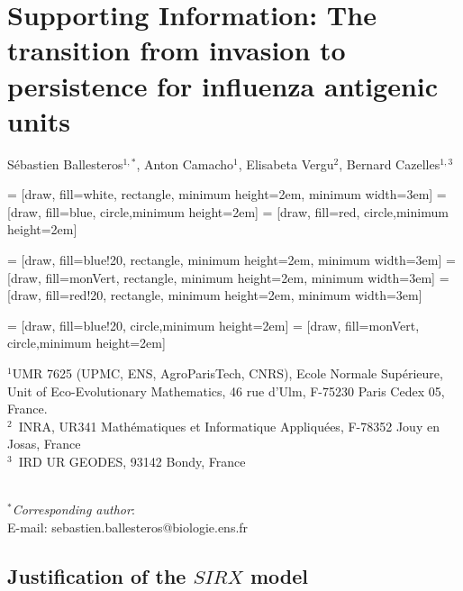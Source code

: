\chapter{Supporting Information: The transition from invasion to
  persistence for influenza antigenic units}





Sébastien Ballesteros$^{1,*}$,
Anton Camacho$^{1}$,
Elisabeta Vergu$^{2}$,
Bernard Cazelles$^{1,3}$

 = [draw, fill=white, rectangle, minimum height=2em, minimum width=3em]
 = [draw, fill=blue, circle,minimum height=2em]
 = [draw, fill=red, circle,minimum height=2em]

 = [draw, fill=blue!20, rectangle, minimum height=2em, minimum width=3em]
 = [draw, fill=monVert, rectangle, minimum height=2em, minimum width=3em]
 = [draw, fill=red!20, rectangle, minimum height=2em, minimum width=3em]

 = [draw, fill=blue!20, circle,minimum height=2em]
 = [draw, fill=monVert, circle,minimum height=2em]



\vspace{2cm}

$^1$UMR 7625  (UPMC, ENS, AgroParisTech, CNRS), Ecole Normale Supérieure, Unit of Eco-Evolutionary Mathematics,  46 rue d'Ulm, F-75230 Paris Cedex 05, France. \\
$^2$~INRA, UR341 Mathématiques et Informatique Appliquées, F-78352 Jouy en Josas, France \\
$^3$~IRD UR GEODES, 93142 Bondy, France

~\\
$^*$\textit{Corresponding author}:  \\
E-mail: sebastien.ballesteros@biologie.ens.fr



\section{Justification of the $SIRX$ model}

